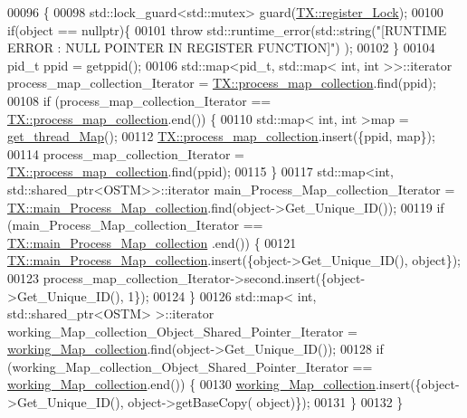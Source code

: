 \begin{DoxyCode}
00096                                              \{
00098     std::lock\_guard<std::mutex> guard(\hyperlink{class_t_x_aa688a8c96fa3cdf8cd92e267463536dc_aa688a8c96fa3cdf8cd92e267463536dc}{TX::register\_Lock});
00100     \textcolor{keywordflow}{if}(\textcolor{keywordtype}{object} == \textcolor{keyword}{nullptr})\{
00101         \textcolor{keywordflow}{throw} std::runtime\_error(std::string(\textcolor{stringliteral}{"[RUNTIME ERROR : NULL POINTER IN REGISTER FUNCTION]"}) );
00102     \}
00104     pid\_t ppid = getppid();
00106     std::map<pid\_t, std::map< int, int >>::iterator process\_map\_collection\_Iterator = 
      \hyperlink{class_t_x_a2e3cd2f52fd93cf6ef3eb3c1cb830b9f_a2e3cd2f52fd93cf6ef3eb3c1cb830b9f}{TX::process\_map\_collection}.find(ppid);
00108     \textcolor{keywordflow}{if} (process\_map\_collection\_Iterator == \hyperlink{class_t_x_a2e3cd2f52fd93cf6ef3eb3c1cb830b9f_a2e3cd2f52fd93cf6ef3eb3c1cb830b9f}{TX::process\_map\_collection}.end()) \{
00110         std::map< int, int >map =  \hyperlink{class_t_x_a3f5671423cb7b9f9c98f8a25f2a4b545_a3f5671423cb7b9f9c98f8a25f2a4b545}{get\_thread\_Map}();
00112         \hyperlink{class_t_x_a2e3cd2f52fd93cf6ef3eb3c1cb830b9f_a2e3cd2f52fd93cf6ef3eb3c1cb830b9f}{TX::process\_map\_collection}.insert(\{ppid, map\});
00114         process\_map\_collection\_Iterator = \hyperlink{class_t_x_a2e3cd2f52fd93cf6ef3eb3c1cb830b9f_a2e3cd2f52fd93cf6ef3eb3c1cb830b9f}{TX::process\_map\_collection}.find(ppid);
00115     \}
00117     std::map<int, std::shared\_ptr<OSTM>>::iterator main\_Process\_Map\_collection\_Iterator = 
      \hyperlink{class_t_x_a1a45d726894190695314464d7cd97c29_a1a45d726894190695314464d7cd97c29}{TX::main\_Process\_Map\_collection}.find(object->Get\_Unique\_ID());
00119     \textcolor{keywordflow}{if} (main\_Process\_Map\_collection\_Iterator == \hyperlink{class_t_x_a1a45d726894190695314464d7cd97c29_a1a45d726894190695314464d7cd97c29}{TX::main\_Process\_Map\_collection}
      .end()) \{
00121         \hyperlink{class_t_x_a1a45d726894190695314464d7cd97c29_a1a45d726894190695314464d7cd97c29}{TX::main\_Process\_Map\_collection}.insert(\{\textcolor{keywordtype}{object}->Get\_Unique\_ID(), \textcolor{keywordtype}{
      object}\});
00123         process\_map\_collection\_Iterator->second.insert(\{\textcolor{keywordtype}{object}->Get\_Unique\_ID(), 1\});
00124     \} 
00126     std::map< int, std::shared\_ptr<OSTM> >::iterator working\_Map\_collection\_Object\_Shared\_Pointer\_Iterator 
      = \hyperlink{class_t_x_a81aafda16e2f20e36ec6c68e584668ff_a81aafda16e2f20e36ec6c68e584668ff}{working\_Map\_collection}.find(object->Get\_Unique\_ID());
00128     \textcolor{keywordflow}{if} (working\_Map\_collection\_Object\_Shared\_Pointer\_Iterator == 
      \hyperlink{class_t_x_a81aafda16e2f20e36ec6c68e584668ff_a81aafda16e2f20e36ec6c68e584668ff}{working\_Map\_collection}.end()) \{
00130         \hyperlink{class_t_x_a81aafda16e2f20e36ec6c68e584668ff_a81aafda16e2f20e36ec6c68e584668ff}{working\_Map\_collection}.insert(\{\textcolor{keywordtype}{object}->Get\_Unique\_ID(), \textcolor{keywordtype}{object}->getBaseCopy(\textcolor{keywordtype}{
      object})\});
00131     \}
00132 \}
\end{DoxyCode}



